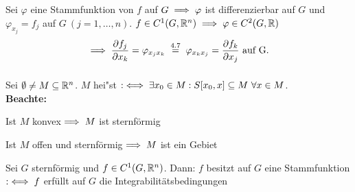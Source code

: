 \documentclass[a4paper,twoside,DIV15,BCOR12mm]{scrbook}
\begin{document}
\begin{beweis}
Sei $\varphi$ eine Stammfunktion von $f$ auf $G\implies\varphi$ ist differenzierbar auf $G$ und $\varphi_{x_j}=f_j$ auf $G\ (j=1,\ldots,n)$. $f\in C^1(G,\mathbb{R}^n)\implies\varphi\in C^2(G,\mathbb{R})$
$$\folgt \frac{\partial f_j}{\partial x_k}=\varphi_{x_jx_k}\gleichnach{4.7}\varphi_{x_kx_j}=\frac{\partial f_k}{\partial x_j}\text{ auf G.}$$ $ $
\end{beweis}

\begin{definition*}
Sei $\emptyset\ne M\subseteq\mathbb{R}^n$. $M$ hei"st  $:\iff\exists x_0\in M: S[x_0,x]\subseteq M\ \forall x\in M$.\\
\textbf{Beachte:}
\begin{liste}
\item Ist $M$ konvex$\implies M$ ist sternförmig
\item Ist $M$ offen und sternförmig$\implies M$ ist ein Gebiet
\end{liste}
\end{definition*}

\begin{satz}
Sei $G$ sternförmig und $f\in C^1(G,\mathbb{R}^n)$. Dann: $f$ besitzt auf $G$ eine Stammfunktion $:\iff f$ erfüllt auf $G$ die Integrabilitätsbedingungen
\end{satz}
\end{document}
